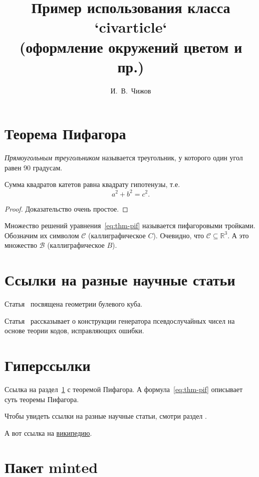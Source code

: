 \documentclass[12pt, minted]{civarticle}
\title{
    Пример использования класса `civarticle`\\
    \small{(оформление окружений цветом и пр.)}
}
\author{И.~В.~Чижов}
\begin{document}
    \section{Теорема Пифагора}
    \label{sec:thm-pif}
    \begin{definition}
        \label{def:triangle}
        \emph{Прямоугольным треугольником} называется треугольник, у которого один угол равен 90 градусам.
    \end{definition}
    \begin{theorem}
        Сумма квадратов катетов равна квадрату гипотенузы, т.е.
        \begin{equation}
            \label{eq:thm-pif}
            a^2+b^2=c^2.
        \end{equation}
    \end{theorem}
    \begin{proof}
        Доказательство очень простое.
    \end{proof}
    Множество решений уравнения~\eqref{eq:thm-pif} называется пифагоровыми тройками.
    Обозначим их символом $\mathcal{C}$ (каллиграфическое $C$).
    Очевидно, что $\mathcal{C}\subseteq \mathbb{R}^{3}$.
    А это множество $\mathcal{B}$ (каллиграфическое $B$).

    \blindmathtrue
    \Blindtext[11][1]


    \section{Ссылки на разные научные статьи}
    \label{sec:ref-to-articles}

    Статья~\cite{ahlswede1977} посвящена геометрии булевого куба.

    Статья~\cite{ahmed2013} рассказывает о конструкции генератора псевдослучайных чисел на основе теории кодов, исправляющих ошибки.


    \section{Гиперссылки}
    \label{sec:hyper}

    Ссылка на раздел~\ref{sec:thm-pif} с теоремой Пифагора.
    А формула~\eqref{eq:thm-pif} описывает суть теоремы Пифагора.

    Чтобы увидеть ссылки на разные научные статьи, смотри раздел \hyperref[sec:ref-to-articles]{}.

    А вот ссылка на \href{www.wikipedia.ru}{википедию}.


    \section{Пакет minted}
    \label{sec:minted}
    \if \MINTED\empty
    \else
        \inputminted{python}{code.py}
    \fi
\end{document}
